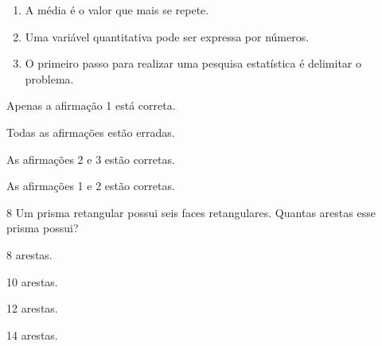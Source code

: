 \begin{enumerate}
\item A média é o valor que mais se repete.

\item Uma variável quantitativa pode ser expressa por números.

\item O primeiro passo para realizar uma pesquisa estatística é delimitar o problema.
\end{enumerate}

\begin{escolha}
\item Apenas a afirmação 1 está correta.
\item Todas as afirmações estão erradas.
\item As afirmações 2 e 3 estão corretas.
\item As afirmações 1 e 2 estão corretas.
\end{escolha}






\num{8} Um prisma retangular possui seis faces retangulares. Quantas arestas
esse prisma possui?

\begin{escolha}
\item 8 arestas.
\item 10 arestas.
\item 12 arestas.
\item 14 arestas.
\end{escolha}



